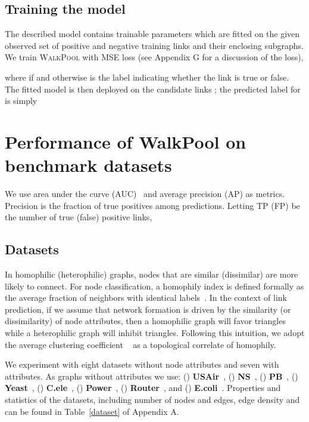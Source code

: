 \documentclass[11pt]{article}
\newcommand{\walkpool}{\textsc{WalkPool}\xspace}
\newcommand{\UPDATE}[1]{\textcolor{WowColor}{{#1}}}
\renewcommand{\UPDATE}[1]{#1}
\begin{document}
\subsection{Training the model}
\vspace{-1mm}
The described model contains trainable parameters  which are fitted on the given observed set  of positive and negative training links and their enclosing subgraphs.
We train \walkpool with MSE loss (see Appendix G for a discussion of the loss),

where  if  and  otherwise is the label indicating whether the link  is true or false. The fitted model is then deployed on the candidate links ; the predicted label for  is simply

\vspace{-1mm}
\section{Performance of WalkPool on benchmark datasets}
\vspace{-1mm}
We use area under the curve (AUC)~\citep{bradley1997use} and average precision (AP) as metrics. Precision is the fraction of true positives among predictions.
Letting TP (FP) be the number of true (false) positive links, 
\vspace{-4mm}
\subsection{Datasets}
\vspace{-2mm}
In homophilic (heterophilic) graphs, nodes that are similar (dissimilar) are more likely to connect. For node classification, a homophily index is defined formally as the average fraction of neighbors with identical labels~\citep{pei2020geom}. In the context of link prediction, if we assume that network formation is driven by the similarity (or dissimilarity) of node attributes, then a homophilic graph will favor triangles while a heterophilic graph will inhibit triangles. Following this intuition, we adopt the average clustering coefficient ~\citep{watts1998collective} as a topological correlate of homophily.

\UPDATE{We experiment with eight datasets without node attributes and seven with attributes. As graphs without attributes we use: (\romannumeral1) \textbf{USAir}~\citep{usair}, (\romannumeral2) \textbf{NS}~\citep{newman2006finding}, (\romannumeral3) \textbf{PB}~\citep{ackland2005mapping},  (\romannumeral4) \textbf{Yeast}~\citep{von2002comparative}, (\romannumeral5) \textbf{C.ele}~\citep{watts1998collective}, (\romannumeral6) \textbf{Power}~\citep{watts1998collective}, (\romannumeral7) \textbf{Router}~\citep{spring2002measuring}, and (\romannumeral8) \textbf{E.coli}~\citep{zhang2018beyond}. Properties and statistics of the datasets, including number of nodes and edges, edge density and  can be found in Table~\ref{dataset} of Appendix A.}
\end{document}
